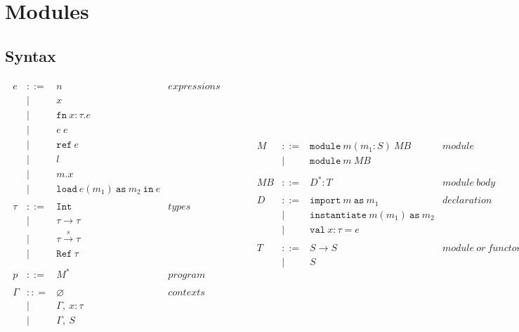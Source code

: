 \documentclass{llncs}
\newcommand{\keyw}[1]{\mathtt{#1}~}
\newcommand{\reftt}{\mathtt{ref}~}
\newcommand{\Reftt}{\mathtt{Ref}~}
\newcommand{\Inttt}{\mathtt{Int}~}
\begin{document}
\section{Modules}

\subsection{Syntax}

\[
\begin{array}{lll}
\begin{array}{lllr}
e & ::= & n & expressions \\
& | & x\\
& | & \keyw{fn} x : \tau . e \\
& | & e~e\\
& | & \reftt e \\
& | & l \\
& | & m.x \\
& | & \keyw{load} e(m_1)~\keyw{as} m_2~\keyw{in} e \\
&&\\
\tau & ::= & \Inttt & types \\
& | & \tau \rightarrow \tau \\
& | & \tau \xrightarrow{s} \tau \\
& | & \Reftt \tau \\
&&\\
p & ::= & M^* & program\\
&&\\
\Gamma & :: = & \varnothing & contexts\\
& | & \Gamma,~x : \tau\\
& | & \Gamma,~S\\
\end{array}
& ~~~~~~
&
\begin{array}{lllr}
M & ::= & \keyw{module} m (m_1 : S)~MB & module \\
& | & \keyw{module} m~MB \\
&&\\
MB & ::= & D^* : T & module~body\\
&&\\
D & ::= & \keyw{import} m~\keyw{as} m_1 & declaration \\
& | & \keyw{instantiate} m(m_1)~\keyw{as} m_2 \\
& | & \keyw{val} x : \tau = e \\
&&\\
T & ::= & S \rightarrow S & module~or~functor~type\\
& | & S \\

\end{array}
\end{array}\]
\end{document}
